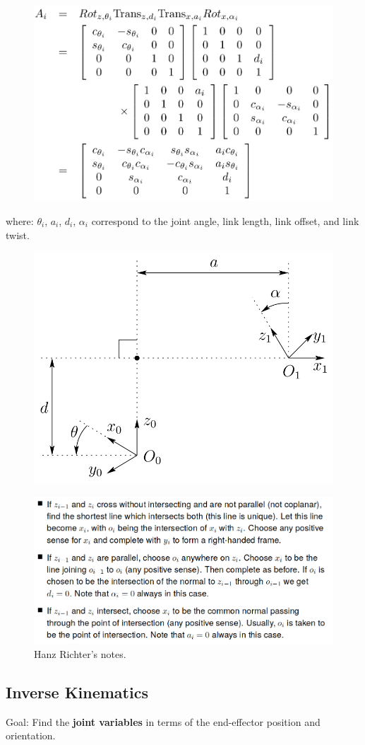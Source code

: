 \documentclass[a4paper,10pt,twocolumn]{article}
\begin{document}
\begin{figure}[H]
\centering
 \includegraphics[width=1\linewidth]{HomTransDH.png}
\end{figure}

where: $\theta_i$, $a_i$, $d_i$, $\alpha_i$ correspond to the joint angle, link length, link offset, and link twist.

\begin{figure}[H]
\centering
 \includegraphics[width=0.8\linewidth]{assumptionsDH.png}
\end{figure}

\begin{figure}[H]
\centering
 \includegraphics[width=1\linewidth]{ThreeCasesDH.png}
 \caption{Hanz Richter's notes.}
\end{figure}


\subsection*{Inverse Kinematics}

Goal: Find the \textbf{joint variables} in terms of the end-effector position and orientation.
\end{document}

